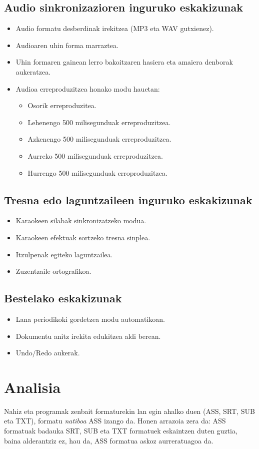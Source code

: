 \subsection{Audio sinkronizazioren inguruko eskakizunak}
\begin{itemize}
\item Audio formatu desberdinak irekitzea (MP3 eta WAV gutxienez).
\item Audioaren uhin forma marraztea.
\item Uhin formaren gainean lerro bakoitzaren hasiera eta amaiera denborak aukeratzea.
\item Audioa erreproduzitzea honako modu hauetan:
	\begin{itemize}
	\item Osorik erreproduzitea.
	\item Lehenengo 500 milisegunduak erreproduzitzea.
	\item Azkenengo 500 milisegunduak erreproduzitzea.
	\item Aurreko 500 milisegunduak erreproduzitzea.
	\item Hurrengo 500 milisegunduak erroproduzitzea.
	\end{itemize}
\end{itemize}
\subsection{Tresna edo laguntzaileen inguruko eskakizunak}
\begin{itemize}
\item Karaokeen silabak sinkronizatzeko modua.
\item Karaokeen efektuak sortzeko tresna sinplea.
\item Itzulpenak egiteko laguntzailea.
\item Zuzentzaile ortografikoa.
\end{itemize}
\subsection{Bestelako eskakizunak}
\begin{itemize}
\item Lana periodikoki gordetzea modu automatikoan.
\item Dokumentu anitz irekita edukitzea aldi berean.
\item Undo/Redo aukerak.
\end{itemize}

\section{Analisia}
Nahiz eta programak zenbait formaturekin lan egin ahalko duen (ASS, SRT, SUB eta TXT), formatu \textit{natiboa} ASS izango da. Honen arrazoia zera da: ASS formatuak badauka SRT, SUB eta TXT formatuek eskaintzen duten guztia, baina alderantziz ez, hau da, ASS formatua askoz aurreratuagoa da. 

